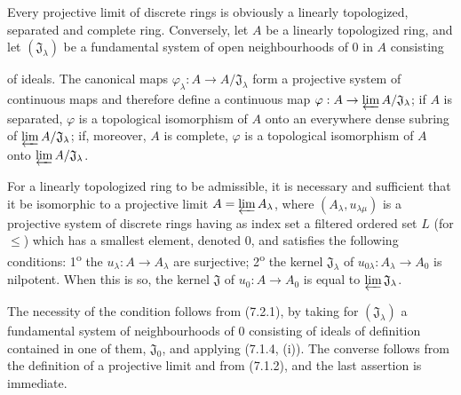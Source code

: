 \begin{env}[7.2.1]
\label{0.7.2.1}
Every projective limit of discrete rings is obviously a linearly
topologized, separated and complete ring. Conversely, let $A$ be a linearly
topologized ring, and let $(\mathfrak J_\lambda)$ be a fundamental system
of open neighbourhoods of $0$ in $A$ consisting


of ideals. The canonical maps
$\varphi_\lambda:A\to A/\mathfrak J_\lambda$ form a projective system of
continuous maps and therefore define a continuous map
$\varphi:A\to\varprojlim A/\mathfrak J_\lambda$; if $A$ is separated,
$\varphi$ is a topological isomorphism of $A$ onto an
everywhere dense subring of $\varprojlim A/\mathfrak J_\lambda$; if,
moreover, $A$ is complete, $\varphi$ is a topological isomorphism of $A$ onto
$\varprojlim A/\mathfrak J_\lambda$.
\end{env}

\begin{lemma}[7.2.2]
\label{0.7.2.2}
For a linearly topologized ring to be admissible, it is necessary and sufficient
that it be isomorphic to a projective limit
$A=\varprojlim A_\lambda$, where $(A_\lambda,u_{\lambda\mu})$ is a
projective system of discrete rings having as index set a filtered ordered
set $L$ (for $\leq$) which has a smallest element, denoted $0$, and satisfies
the following conditions: 1\textsuperscript{o} the
$u_\lambda:A\to A_\lambda$ are surjective; 2\textsuperscript{o} the kernel
$\mathfrak J_\lambda$ of $u_{0\lambda}:A_\lambda\to A_0$ is nilpotent.
When this is so, the kernel $\mathfrak J$ of $u_0:A\to A_0$ is equal to
$\varprojlim\mathfrak J_\lambda$.
\end{lemma}

The necessity of the condition follows from (7.2.1), by taking for
$(\mathfrak J_\lambda)$ a fundamental system of neighbourhoods of $0$ consisting
of ideals of definition contained in one of them, $\mathfrak J_0$, and applying
(7.1.4, (i)). The converse follows from the definition of a projective limit and
from (7.1.2), and the last assertion is immediate.

